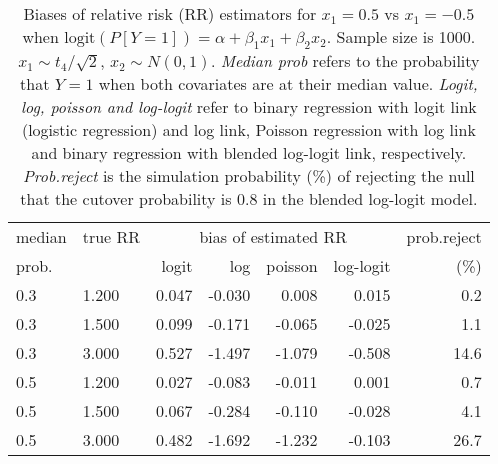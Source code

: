 \documentclass[12pt,a4paper]{article}
\begin{document}
\begin{table}[H] 
\small\sf\centering 
\caption{Biases of relative risk (RR) estimators for $x_1=0.5$ vs $x_1=-0.5$ when $\mbox{logit}(P[Y=1])=\alpha+\beta_1 x_1 + \beta_2 x_2$. Sample size is 1000. $x_1 \sim $$t_4/\sqrt{2}$, $x_2 \sim N(0,1)$. {\it Median prob} refers to the probability that $Y=1$ when both covariates are at their median value. {\it Logit, log, poisson and log-logit} refer to binary regression with logit link (logistic regression) and log link, Poisson regression with log link and binary regression with blended log-logit link, respectively. {\it Prob.reject} is the simulation probability (\%) of rejecting the null that the cutover probability is $0.8$ in the blended log-logit model.} 
\begin{tabular}{llrrrrr} 
\toprule 
median & true RR & \multicolumn{4}{c}{bias of estimated RR} & prob.reject \\ 
prob. & & logit & log & poisson & log-logit  & (\%) \\ \midrule 
0.3 & 1.200 & 0.047 & -0.030 &  0.008 &  0.015 &  0.2 \\  
0.3 & 1.500 & 0.099 & -0.171 & -0.065 & -0.025 &  1.1 \\  
0.3 & 3.000 & 0.527 & -1.497 & -1.079 & -0.508 & 14.6 \\  
0.5 & 1.200 & 0.027 & -0.083 & -0.011 &  0.001 &  0.7 \\  
0.5 & 1.500 & 0.067 & -0.284 & -0.110 & -0.028 &  4.1 \\  
0.5 & 3.000 & 0.482 & -1.692 & -1.232 & -0.103 & 26.7 \\  
\bottomrule 
\end{tabular} 
\end{table} 
\end{document}
